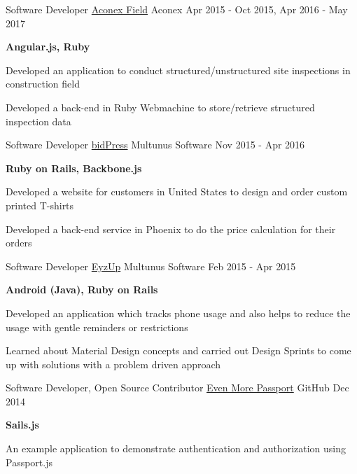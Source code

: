 \begin{cventries} 
  \cventry
    {Software Developer}
    {\href{https://www.aconex.com/support/aconex-field}{Aconex Field}}
    {Aconex}
    {Apr 2015 - Oct 2015, Apr 2016 - May 2017}
    {
      \begin{cvitems}
        \item {\textbf{Angular.js, Ruby}}
        \item {Developed an application to conduct structured/unstructured site inspections in construction field}
        \item {Developed a back-end in Ruby Webmachine to store/retrieve structured inspection data}
      \end{cvitems}
    }
  \cventry
    {Software Developer}
    {\href{https://www.bidpress.com/}{bidPress}}
    {Multunus Software}
    {Nov 2015 - Apr 2016}
    {
      \begin{cvitems}
        \item {\textbf{Ruby on Rails, Backbone.js}}
        \item {Developed a website for customers in United States to design and order custom printed T-shirts}
        \item {Developed a back-end service in Phoenix to do the price calculation for their orders}
      \end{cvitems}
    }
  \cventry
    {Software Developer}
    {\href{https://play.google.com/store/apps/details?id=com.eyz_up.android}{EyzUp}}
    {Multunus Software}
    {Feb 2015 - Apr 2015}
    {
      \begin{cvitems}
        \item {\textbf{Android (Java), Ruby on Rails}}
        \item {Developed an application which tracks phone usage and also helps to reduce the usage with gentle reminders or restrictions}
        \item {Learned about Material Design concepts and carried out Design Sprints to come up with solutions with a problem driven approach}
      \end{cvitems}
    }
  \cventry
    {Software Developer, Open Source Contributor}
    {\href{https://github.com/sails101/even-more-passport/}{Even More Passport}}
    {GitHub}
    {Dec 2014}
    {
      \begin{cvitems}
        \item {\textbf{Sails.js}}
        \item {An example application to demonstrate authentication and authorization using Passport.js}

\end{cvitems}}
\end{cventries}
